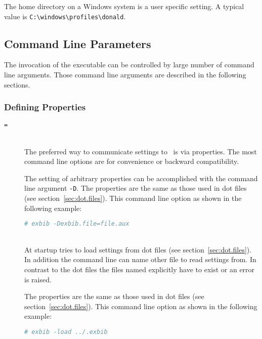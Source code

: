 The home directory on a Windows system is a user
specific setting.  A typical value is
\verb|C:\windows\profiles\donald|.
%
%

\subsection{Command Line Parameters}

The invocation of the executable  can be controlled by
large number of command line arguments. Those command line arguments
are described in the following sections.

\subsubsection{Defining Properties}

\begin{description}
\item[\texttt{=}]\ \\
  
  The preferred way to communicate settings to \ExBib\ is via
  properties. The most command line options are for convenience or
  backward compatibility.
  
  The setting of arbitrary properties can be accomplished with the
  command line argument \texttt{-D}. The properties are the same as
  those used in dot files (see
  section~\ref{sec:dot.files}). This command line option as shown in
  the following example:

\begin{lstlisting}[language=sh]
# exbib -Dexbib.file=file.aux
\end{lstlisting}

\item[ ]\ \\
  
  At startup  tries to load settings from dot
  files (see section~\ref{sec:dot.files}). In addition
  the command line can name other file to read settings from. In
  contrast to the dot files the files named explicitly have to exist
  or an error is raised.
  
  The properties are the same as those used in dot files (see section~\ref{sec:dot.files}). This command line option
  as shown in the following example:

\begin{lstlisting}[language=sh]
# exbib -load ../.exbib
\end{lstlisting}

\end{description}


